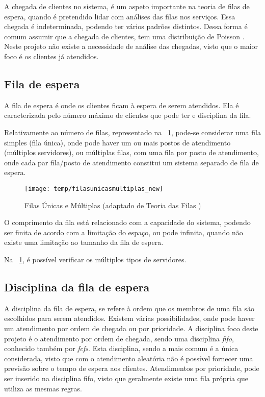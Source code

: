 A chegada de clientes no sistema, é um aspeto importante na teoria de filas de espera, quando é pretendido lidar com análises das filas nos serviços. Essa chegada é indeterminada, podendo ter vários padrões distintos. Dessa forma é comum assumir que a chegada de clientes, tem uma distribuição de Poisson \cite{poissondistribuition}. Neste projeto não existe a necessidade de análise das chegadas, visto que o maior foco é os clientes já atendidos. \\

\subsection{Fila de espera} 

A fila de espera é onde os clientes ficam à espera de serem atendidos. Ela é caracterizada pelo número máximo de clientes que pode ter e disciplina da fila.

Relativamente ao número de filas, representado na \figurename~\ref{fig:filasunicasmultiplas}, pode-se considerar uma fila simples (fila única), onde pode haver um ou mais postos de atendimento (múltiplos servidores), ou múltiplas filas, com uma fila por posto de atendimento, onde cada par fila/posto de atendimento constitui um sistema separado de fila de espera.

\begin{figure}[ht]
    \centering
    \texttt{[image: temp/filasunicasmultiplas\_new]}
      \caption{Filas Únicas e Múltiplas (adaptado de Teoria das Filas \cite{teoriadasfilas})}
  \label{fig:filasunicasmultiplas}
\end{figure}

O comprimento da fila está relacionado com a capacidade do sistema, podendo ser finita de acordo com a limitação do espaço, ou pode infinita, quando não existe uma limitação ao tamanho da fila de espera.

Na \figurename~\ref{fig:filasunicasmultiplas}, é possível verificar os múltiplos tipos de servidores.

\subsection{Disciplina da fila de espera} 

A disciplina da fila de espera, se refere à ordem que os membros de uma fila são escolhidos para serem atendidos. Existem várias possibilidades, onde pode haver um atendimento por ordem de chegada ou por prioridade. A disciplina foco deste projeto é o atendimento por ordem de chegada, sendo uma disciplina \textit{\acrfull{fifo}}, conhecido também por \textit{\acrfull{fcfs}}. Esta disciplina, sendo a mais comum é a única considerada, visto que com o atendimento aleatória não é possível fornecer uma previsão sobre o tempo de espera aos clientes. Atendimentos por prioridade, pode ser inserido na disciplina \acrshort{fifo}, visto que geralmente existe uma fila própria que utiliza as mesmas regras.

